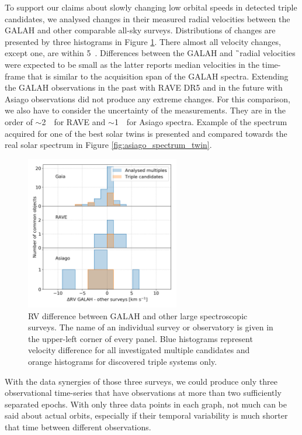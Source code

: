 To support our claims about slowly changing low orbital speeds in detected triple candidates, we analysed changes in their measured radial velocities between the GALAH and other comparable all-sky surveys. Distributions of changes are presented by three histograms in Figure \ref{fig:rv_survey}. There almost all velocity changes, except one, are within 5~\kms. Differences between the GALAH and \G\ radial velocities were expected to be small as the latter reports median velocities in the time-frame that is similar to the acquisition span of the GALAH spectra. Extending the GALAH observations in the past with RAVE DR5 \cite{2017AJ....153...75K} and in the future with Asiago observations did not produce any extreme changes. For this comparison, we also have to consider the uncertainty of the measurements. They are in the order of $\sim$2~\kms\ for RAVE and $\sim$1~\kms\ for Asiago spectra. Example of the spectrum acquired for one of the best solar twins is presented and compared towards the real solar spectrum in Figure \ref{fig:asiago_spectrum_twin}.

\begin{figure}
	\centering
	\includegraphics[width=0.6\textwidth]{guess_all_rv_diff.png}
	\caption{RV difference between GALAH and other large spectroscopic surveys. The name of an individual survey or observatory is given in the upper-left corner of every panel. Blue histograms represent velocity difference for all investigated multiple candidates and orange histograms for discovered triple systems only.}
	\label{fig:rv_survey}
\end{figure}

With the data synergies of those three surveys, we could produce only three observational time-series that have observations at more than two sufficiently separated epochs. With only three data points in each graph, not much can be said about actual orbits, especially if their temporal variability is much shorter that time between different observations.

